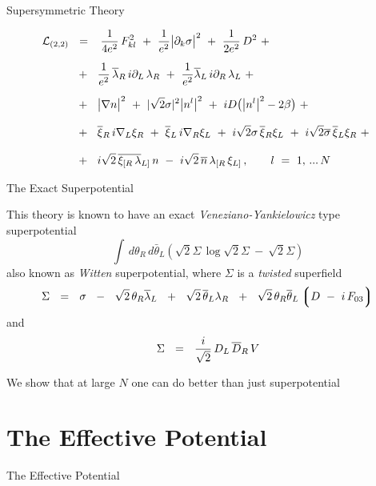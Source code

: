 \documentclass{beamer}
\begin{document}
\begin{frame}{\ntwot Supersymmetric Theory}

\begin{align}
% 
\notag
 	\mc{L}_\text{(2,2)} & ~~=~~
	\,\frac{1}{4e^2}\,F_{kl}^2  ~+~ \frac{1}{e^2} \big|\p_k \sigma\big|^2 
	~+~ \frac{1}{2e^2}\, D^2 ~+~
	\\[2mm]
%
\notag
	&
	~~+~~
	\frac{1}{e^2}\, \blar\, i\p_L\, \lar  ~+~  \frac{1}{e^2} \blal\, i\p_R\, \lal
	~+~
	\\[2mm]
%
\notag
	&
	~~+~~
	\big| \nabla n \big|^2  ~+~ | \sqrt{2}\sigma |^2 \big| n^l \big|^2
	~+~ iD \big( \big|n^l \big|^2 - 2\beta \big)
	~+~
	\\[2.8mm]
%
\notag	&
	~~+~~ \bxir\, i\nabla_L \xir  ~+~ \bxil\, i\nabla_R \xil ~+~
	i\sqrt{2}\sigma\, \bxir \xil
	~+~ i\sqrt{2}\ov{\sigma}\, \bxil \xir
	~+~
	\\[2.8mm]
%
\notag
	&
	~~+~~ i\sqrt{2}\, \ov{\xi_{[R}\, \lambda}{}_{L]}\, n
	~-~ i\sqrt{2}\, \nbar\,  \lambda_{[R}\, \xi_{L]}\,,
	\qquad
	l  ~=~  1,\,...\,N
\end{align}

\end{frame}


\begin{frame}{The Exact Superpotential}
	
	This theory is known to have an exact {\it Veneziano-Yankielowicz} type
	superpotential
\[
	\int\, 	d\theta_R\, d\bar\theta_L \left( \sqrt{2}\Sigma\, \log \sqrt{2}\Sigma ~-~  
					         \sqrt{2}\Sigma \right)
\]
	also known as {\it Witten} superpotential,
	where $ \Sigma $ is a {\it twisted} superfield
\[
	\Sigma     ~~=~~    \sigma  ~~-~~  \sqrt{2}\, \theta_R \overline\lambda{}_L
				    ~~+~~  \sqrt{2}\, \overline\theta{}_L \lambda_R
				    ~~+~~  \sqrt{2}\, \theta_R \overline\theta{}_L \left\lgroup D ~-~ i\, F_{03} \right\rgroup
\]	
	and
\[
	\Sigma    ~~=~~    \frac{i}{\sqrt 2}\, D_L\, \overline D{}_R\, V
\]

	We show that at large $ N $ one can do better than just superpotential

\end{frame}




\section{The Effective Potential}
\begin{frame}{}
\fontsize{60pt}{60pt}\selectfont
\begin{center}
        The Effective Potential
\end{center}
\end{frame}
\end{document}
